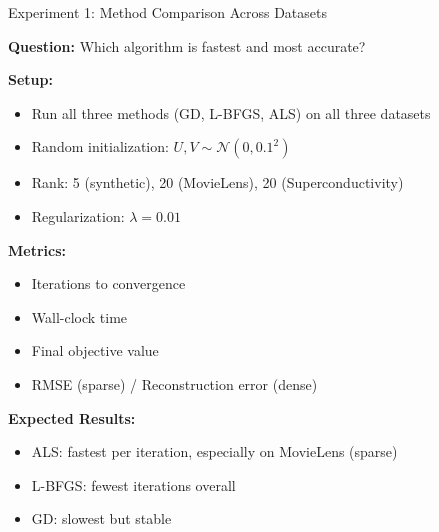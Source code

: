 \documentclass[aspectratio=169,usenames,dvipsnames]{beamer}
\begin{document}
\begin{frame}{Experiment 1: Method Comparison Across Datasets}

\textbf{Question:} Which algorithm is fastest and most accurate?

\vspace{0.3cm}

\textbf{Setup:}
\begin{itemize}
  \item Run all three methods (GD, L-BFGS, ALS) on all three datasets
  \item Random initialization: $U, V \sim \mathcal{N}(0, 0.1^2)$
  \item Rank: 5 (synthetic), 20 (MovieLens), 20 (Superconductivity)
  \item Regularization: $\lambda = 0.01$
\end{itemize}

\vspace{0.3cm}

\textbf{Metrics:}
\begin{itemize}
  \item Iterations to convergence
  \item Wall-clock time
  \item Final objective value
  \item RMSE (sparse) / Reconstruction error (dense)
\end{itemize}

\vspace{0.3cm}

\textbf{Expected Results:}
\begin{itemize}
  \item ALS: fastest per iteration, especially on MovieLens (sparse)
  \item L-BFGS: fewest iterations overall
  \item GD: slowest but stable
\end{itemize}

\end{frame}
\end{document}

